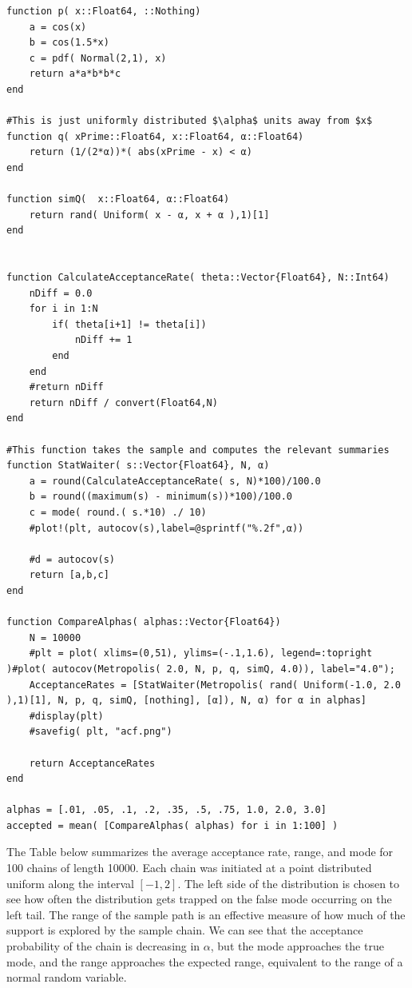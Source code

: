 \documentclass[12pt]{paper}
\begin{document}
\begin{verbatim}
function p( x::Float64, ::Nothing)
    a = cos(x)
    b = cos(1.5*x)
    c = pdf( Normal(2,1), x)
    return a*a*b*b*c
end

#This is just uniformly distributed $\alpha$ units away from $x$
function q( xPrime::Float64, x::Float64, α::Float64)
    return (1/(2*α))*( abs(xPrime - x) < α)
end

function simQ(  x::Float64, α::Float64)
    return rand( Uniform( x - α, x + α ),1)[1]
end


function CalculateAcceptanceRate( theta::Vector{Float64}, N::Int64)
    nDiff = 0.0
    for i in 1:N
        if( theta[i+1] != theta[i])
            nDiff += 1
        end
    end
    #return nDiff
    return nDiff / convert(Float64,N)
end

#This function takes the sample and computes the relevant summaries
function StatWaiter( s::Vector{Float64}, N, α)
    a = round(CalculateAcceptanceRate( s, N)*100)/100.0
    b = round((maximum(s) - minimum(s))*100)/100.0
    c = mode( round.( s.*10) ./ 10)
    #plot!(plt, autocov(s),label=@sprintf("%.2f",α))

    #d = autocov(s)    
    return [a,b,c]
end

function CompareAlphas( alphas::Vector{Float64})
    N = 10000
    #plt = plot( xlims=(0,51), ylims=(-.1,1.6), legend=:topright )#plot( autocov(Metropolis( 2.0, N, p, q, simQ, 4.0)), label="4.0");
    AcceptanceRates = [StatWaiter(Metropolis( rand( Uniform(-1.0, 2.0 ),1)[1], N, p, q, simQ, [nothing], [α]), N, α) for α in alphas]
    #display(plt)
    #savefig( plt, "acf.png")

    return AcceptanceRates
end

alphas = [.01, .05, .1, .2, .35, .5, .75, 1.0, 2.0, 3.0]
accepted = mean( [CompareAlphas( alphas) for i in 1:100] )
\end{verbatim}


The Table below summarizes the average acceptance rate, range, and
mode for 100 chains of length 10000.  Each chain was initiated at a
point distributed uniform along the interval \([-1,2]\). The left side
of the distribution is chosen to see how often the distribution gets
trapped on the false mode occurring on the left tail. The range of the
sample path is an effective measure of how much of the support is
explored by the sample chain. We can see that the acceptance
probability of the chain is decreasing in \(\alpha\), but the mode approaches
the true mode, and the range approaches the expected range, equivalent
to the range of a normal random variable.
\end{document}

